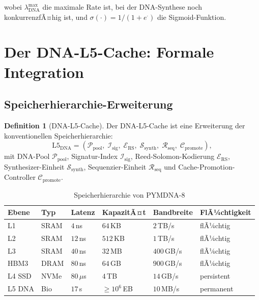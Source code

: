 ﻿\documentclass[a4paper,12pt]{article}
\theoremstyle{definition}
\newtheorem{definition}{Definition}[section]
\begin{document}
wobei $\lambda_{\mathrm{DNA}}^{\mathrm{max}}$ die maximale Rate ist,
bei der DNA-Synthese noch konkurrenzfÃ¤hig ist, und
$\sigma(\cdot) = 1/(1 + e^\cdot)$ die Sigmoid-Funktion.

\section{Der DNA-L5-Cache: Formale Integration}

\subsection{Speicherhierarchie-Erweiterung}

\begin{definition}[DNA-L5-Cache]
  \label{def:l5_dna}
  Der DNA-L5-Cache ist eine Erweiterung der konventionellen Speicherhierarchie:
  \[
    \mathrm{L5}_{\mathrm{DNA}} = (\mathcal{P}_{\mathrm{pool}},\;
    \mathcal{I}_{\mathrm{sig}},\; \mathcal{E}_{\mathrm{RS}},\;
    \mathcal{S}_{\mathrm{synth}},\; \mathcal{R}_{\mathrm{seq}},\;
    \mathcal{C}_{\mathrm{promote}}),
  \]
  mit DNA-Pool $\mathcal{P}_{\mathrm{pool}}$, Signatur-Index $\mathcal{I}_{\mathrm{sig}}$,
  Reed-Solomon-Kodierung $\mathcal{E}_{\mathrm{RS}}$, Synthesizer-Einheit
  $\mathcal{S}_{\mathrm{synth}}$, Sequenzier-Einheit $\mathcal{R}_{\mathrm{seq}}$
  und Cache-Promotion-Controller $\mathcal{C}_{\mathrm{promote}}$.
\end{definition}

\begin{table}[H]
  \centering
  \caption{Speicherhierarchie von PYMDNA-8}
  \label{tab:hierarchy}
  \renewcommand{\arraystretch}{1.35}
  \begin{tabular}{llllll}
    \toprule
    \textbf{Ebene} & \textbf{Typ} & \textbf{Latenz} & \textbf{KapazitÃ¤t}
    & \textbf{Bandbreite} & \textbf{FlÃ¼chtigkeit} \\
    \midrule
    L1  & SRAM  & $4$\,ns    & $64$\,KB    & $2$\,TB/s  & flÃ¼chtig \\
    L2  & SRAM  & $12$\,ns   & $512$\,KB   & $1$\,TB/s  & flÃ¼chtig \\
    L3  & SRAM  & $40$\,ns   & $32$\,MB    & $400$\,GB/s & flÃ¼chtig \\
    HBM3 & DRAM  & $80$\,ns   & $64$\,GB    & $900$\,GB/s & flÃ¼chtig \\
    L4 SSD & NVMe & $80$\,$\mu$s & $4$\,TB   & $14$\,GB/s & persistent \\
    L5 DNA & Bio  & $17$\,s    & $\ge 10^6$\,EB & $10$\,MB/s & permanent \\
    \bottomrule
  \end{tabular}
\end{table}
\end{document}
